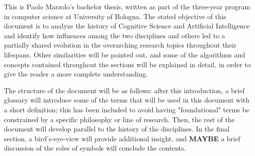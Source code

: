 \documentclass[../main.tex]{subfiles}
\begin{document}
This is Paolo Marzolo's bachelor thesis, written as part of the three-year program in computer science at University of Bologna. The stated objective of this document is to analyze the history of Cognitive Science and Artificial Intelligence and identify how influences among the two disciplines and others led to a partially shared evolution in the overarching research topics throughout their lifespans. Other similarities will be pointed out, and some of the algorithms and concepts contained throughout the sections will be explained in detail, in order to give the reader a more complete understanding.

The structure of the document will be as follows: after this introduction, a brief glossary will introduce some of the terms that will be used in this document with a short definition; this has been included to avoid having "foundational" terms be constrained by a specific philosophy or line of research. Then, the rest of the document will develop parallel to the history of the disciplines. In the final section, a bird's-eye-view will provide additional insight, and \textbf{MAYBE} a brief discussion of the roles of symbols will conclude the contents.
\end{document}
